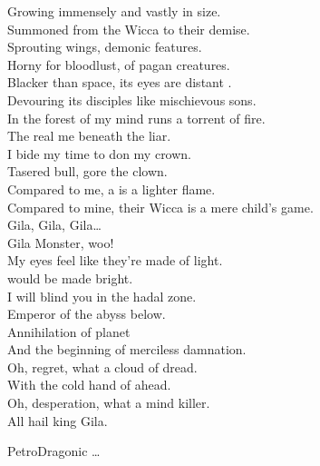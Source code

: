 
Growing immensely and vastly in size. \\
Summoned from the Wicca to their demise. \\
Sprouting wings, demonic features. \\
Horny for bloodlust,  of pagan creatures. \\
Blacker than space, its eyes are distant . \\
Devouring its disciples like mischievous sons. \\

In the forest of my mind runs a torrent of fire. \\
The real me beneath the liar. \\
I bide my time to don my crown. \\
Tasered bull, gore the clown. \\
Compared to me, a  is a lighter flame. \\
Compared to mine, their Wicca is a mere child's game. \\

Gila, Gila, Gila… \\
Gila Monster, woo! \\

My eyes feel like they're made of light. \\
 would be made bright. \\
I will blind you in the hadal zone. \\
Emperor of the abyss below. \\

Annihilation of planet  \\
And the beginning of merciless damnation. \\

Oh, regret, what a cloud of dread. \\
With the cold hand of  ahead. \\
Oh, desperation, what a mind killer. \\
All hail king Gila. \\




PetroDragonic … \\

